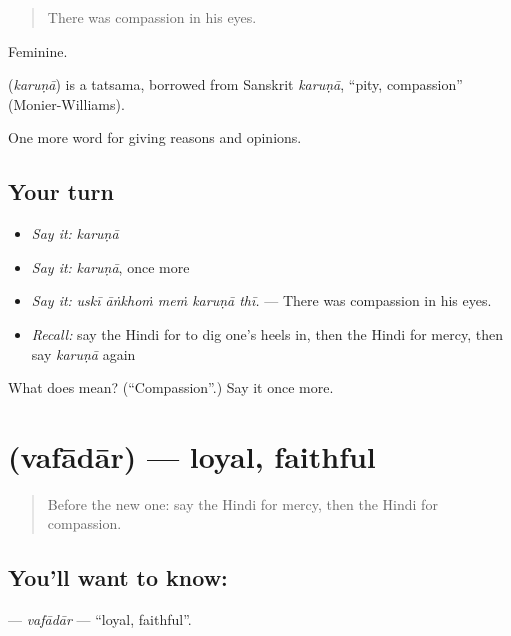 \begin{quote}
There was compassion in his eyes.
\end{quote}

Feminine.

\begin{cousinweb}
\textbf{} (\emph{karuṇā}) is a tatsama, borrowed from Sanskrit \emph{karuṇā}, \textquotedblleft{}pity, compassion\textquotedblright{} (Monier-Williams).
\end{cousinweb}

\begin{grammarlens}[title={What you've built}]
One more word for giving reasons and opinions.
\end{grammarlens}

\subsection*{Your turn}
\begin{itemize}
\raggedright
  \item \emph{Say it:} \emph{karuṇā}
  \item \emph{Say it:} \emph{karuṇā}, once more
  \item \emph{Say it:} \emph{uskī āṅkhoṁ meṁ karuṇā thī.} — There was compassion in his eyes.
  \item \emph{Recall:} say the Hindi for to dig one's heels in, then the Hindi for mercy, then say \emph{karuṇā} again
\end{itemize}

\begin{tcolorbox}[breakable,colback=teal!4,colframe=teal!35!black,title={Before you move on}]
What does  mean? (\textquotedblleft{}Compassion\textquotedblright{}.) Say it once more.
\end{tcolorbox}
\section[\texorpdfstring{\hi{वफ़ादार} (vafādār)}{वफ़ादार (vafādār)}]{ (vafādār) — loyal, faithful}

\label{lesson:HI-C372-vafadar}



\begin{quote}
Before the new one: say the Hindi for mercy, then the Hindi for compassion.
\end{quote}

\subsection*{You'll want to know: }
\textbf{} — \emph{vafādār} — \textquotedblleft{}loyal, faithful\textquotedblright{}.

